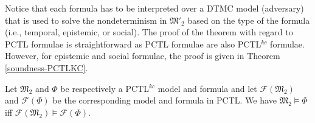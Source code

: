 Notice that each formula has to be interpreted over a DTMC model
(adversary) that is used to solve the nondeterminism in
$\mathfrak{M'_2}$ based on the type of the formula (i.e.,
temporal, epistemic, or social). The proof of the theorem with
regard to PCTL formulae is straightforward as PCTL formulae are
also PCTL$^{kc}$ formulae. However, for epistemic and social
formulae, the proof is given in Theorem \ref{soundness-PCTLKC}.



\begin{theorem}\label{soundness-PCTLKC}
Let $\mathfrak{M_2}$ and $\Phi$ be respectively a PCTL$^{kc}$ model
and formula and let $\mathscr{F}(\mathfrak{M_2})$  and $\mathscr{F}(\Phi)$ be the corresponding model and formula in PCTL. We have $\mathfrak{M_2}\models\Phi$ iff $\mathscr{F}(\mathfrak{M_2}) \models \mathscr{F}(\Phi)$.
\end{theorem}

